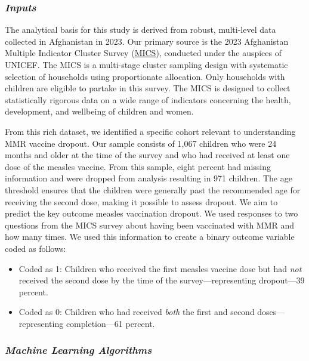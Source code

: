 \documentclass[
  12pt]{article}
\begin{document}
\subsubsection{\texorpdfstring{\emph{Inputs}}{Inputs}}\label{inputs}

The analytical basis for this study is derived from robust, multi-level
data collected in Afghanistan in 2023. Our primary source is the 2023
Afghanistan Multiple Indicator Cluster Survey
(\href{https://mics.unicef.org/surveys}{MICS}), conducted under the
auspices of UNICEF. The MICS is a multi-stage cluster sampling design
with systematic selection of households using proportionate allocation.
Only households with children are eligible to partake in this survey.
The MICS is designed to collect statistically rigorous data on a wide
range of indicators concerning the health, development, and wellbeing of
children and women.

From this rich dataset, we identified a specific cohort relevant to
understanding MMR vaccine dropout. Our sample consists of 1,067 children
who were 24 months and older at the time of the survey and who had
received at least one dose of the measles vaccine. From this sample,
eight percent had missing information and were dropped from analysis
resulting in 971 children. The age threshold ensures that the children
were generally past the recommended age for receiving the second dose,
making it possible to assess dropout. We aim to predict the key outcome
measles vaccination dropout. We used responses to two questions from the
MICS survey about having been vaccinated with MMR and how many times. We
used this information to create a binary outcome variable coded as
follows:

\begin{itemize}
\item
  Coded as 1: Children who received the first measles vaccine dose but
  had \emph{not} received the second dose by the time of the
  survey---representing dropout---39 percent.
\item
  Coded as 0: Children who had received \emph{both} the first and second
  doses---representing completion---61 percent.
\end{itemize}

\subsubsection{\texorpdfstring{\emph{Machine Learning
Algorithms}}{Machine Learning Algorithms}}\label{machine-learning-algorithms}
\end{document}

